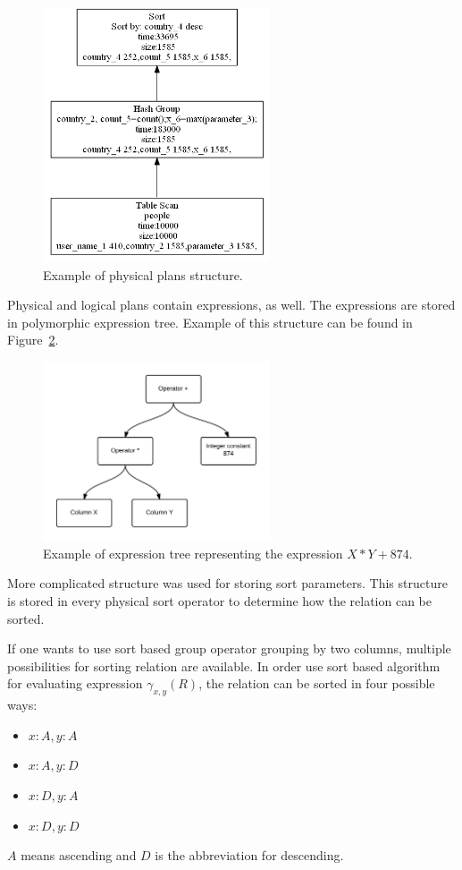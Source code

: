\begin{figure}[h!]
  \centering
    \includegraphics[width=0.6\textwidth]{groupplan}

      \caption{Example of physical plans structure.}
          \label{fig:groupplan}
\end{figure}

Physical and logical plans contain expressions, as well. The expressions are stored in polymorphic expression tree. Example of this structure can be found in Figure~\ref*{fig:expressiontree}.
\begin{figure}[h!]
  \centering
    \includegraphics[width=0.6\textwidth]{expressiontree}

      \caption{Example of expression tree representing the expression $X*Y+874$.}
          \label{fig:expressiontree}
\end{figure}

More complicated structure was used for storing sort parameters. This structure is stored in every physical sort operator to determine how the relation can be sorted. 

If one wants to use sort based group operator grouping by two columns, multiple possibilities for sorting relation are available. In order use sort based algorithm for evaluating expression $\gamma_{x,y}(R)$, the relation can be sorted in four possible ways:
\begin{itemize}
\item $x:A,y:A$
\item $x:A,y:D$
\item $x:D,y:A$
\item $x:D,y:D$
\end{itemize}
$A$ means ascending and $D$ is the abbreviation for descending.

